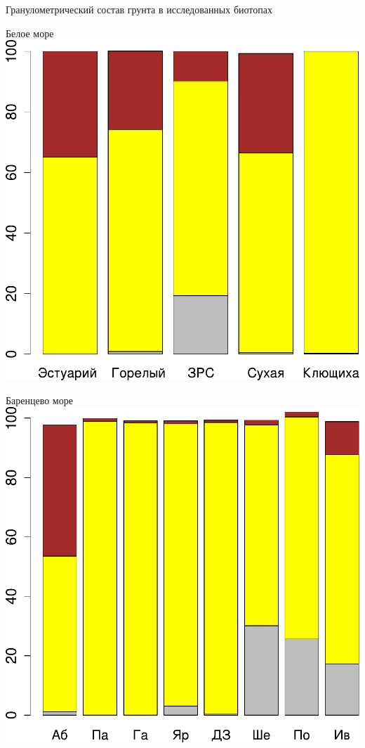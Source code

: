 \documentclass{beamer}
\begin{document}
\begin{frame}{Гранулометрический состав грунта в исследованных биотопах}
	\begin{minipage}[t]{.49\linewidth}
		\begin{center}
		{\footnotesize Белое море}
			\includegraphics[width=\textwidth]{grunty_white1.pdf}
		\end{center}
	\end{minipage}
%
	\begin{minipage}[t]{.49\linewidth}
		\begin{center}
		{\footnotesize Баренцево море}
			\includegraphics[width=\textwidth]{grunty_barents1.pdf}
		\end{center}
	\end{minipage}


\end{frame}
\end{document}

